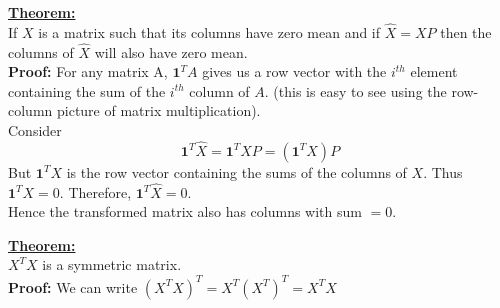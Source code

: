 \begin{frame}
  \begin{overlayarea}{\textwidth}{\textheight}
    {\underline{\textbf{Theorem:}}\\
    If $X$ is a matrix such that its columns have zero mean %
    and if $\hat{X}=XP$ then the columns of $\hat{X}$ will also have zero mean.
    } \\%
    {
      \textbf{Proof:} For any matrix A, $\mathbf{1}^{T} A$ gives us a row vector with the $i^{th}$ element containing the sum of the $i^{th}$ column of $A$. (this is easy to see using the row-column picture of matrix multiplication).\\
    }
    {
      Consider \[\mathbf{1}^{T} \hat{X} = \mathbf{1}^{T} X P = (\mathbf{1}^{T} X) P\]
      But $\mathbf{1}^{T} X$ is the row vector containing the sums of the columns of $X$. Thus $\mathbf{1}^{T} X = 0$.
      Therefore, $\mathbf{1}^T \hat{X} = 0$. \\
      Hence the transformed matrix also has columns with  sum $= 0$.
    }
    
    \vspace{0.3cm}
    {\underline{\textbf{Theorem:}}\\
    $X^T X$ is a symmetric matrix.}\\
    {\textbf{Proof: } We can write $(X^{T} X)^{T} = X^{T} (X^{T})^{T} = X^{T} X$
    }
  \end{overlayarea}
\end{frame}

